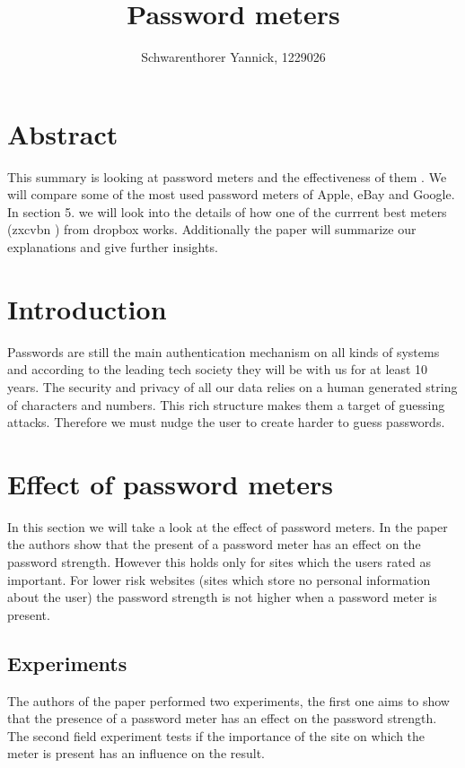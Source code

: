 \documentclass[12pt,a4paper]{article}
\author{Schwarenthorer Yannick, 1229026}
\title{\vspace{-3cm}Password meters}
\begin{document}
\maketitle


\section*{Abstract}
\label{sec:abstract}
This summary is looking at password meters and the effectiveness of them \cite{upToEleven} \cite{measureUp} .
We will compare some of the most used password meters \cite{weakToStrong} of Apple, eBay and Google. 
In section 5. we will look into the details of how one of the currrent best meters (zxcvbn \cite{zxcvbn}) from dropbox works. Additionally the paper   \cite{differentapproaches} will summarize our explanations and give further insights.



\section{Introduction}
\label{sec:introduction}
Passwords are still the main authentication mechanism on all kinds of systems and according to the leading tech society they will be with us for at least 10 years.
The security and privacy of all our data relies on a human generated string of characters and numbers.
This rich structure makes them a target of guessing attacks. Therefore we must nudge the user to create harder to guess passwords.

\section{Effect of password meters}

\label{sec:effect}
In this section we will take a look at the effect of password meters.
In the paper  \cite{upToEleven} the authors show that the present of a password meter has an effect on the password strength. However this holds only for sites which the users rated as important. For lower risk websites (sites which store no personal information about the user) the password strength is not higher when a password meter is present.


\subsection{Experiments}
The authors of the paper performed two experiments, the first one aims to show that the presence of a password meter has an effect on the password strength. The second field experiment tests if the importance of the site on which the meter is present has an influence on the result.
\end{document}
